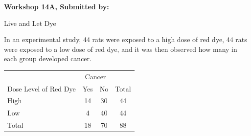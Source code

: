 \documentclass[11pt, chapterprefix=true]{scrbook}\usepackage[]{graphicx}\usepackage[]{color}
\begin{document}
\begin{exercises}
\begin{exercise}
\end{exercise} 
\begin{solution}  %


\end{solution}


\clearpage

    \begin{exercise}  %

    \begin{center}
\begin{flushleft}\textbf{\large \hfill Workshop 14A, Submitted by: }\end{flushleft}

\end{center}

Live and Let Dye

In an experimental study, 44 rats were exposed to a high dose of red dye, 44 rats were exposed to a low dose of red dye, and it was then observed how many in each group developed cancer. 

\begin{center} 				
\begin{tabular}{@{} lccc @{}} \hline				
   & \multicolumn{2}{c}{Cancer} \\ 
Dose Level of Red Dye &	Yes	 & No &	Total \\ \hline
High &	14	& 30 &	44 \\ 
Low &	4 &	40 &	44  \\ \hline
Total &	18 &	70 & 88 \\ \hline
\end{tabular}
\end{center}
				

\end{exercise}
\end{exercises}
\end{document}
